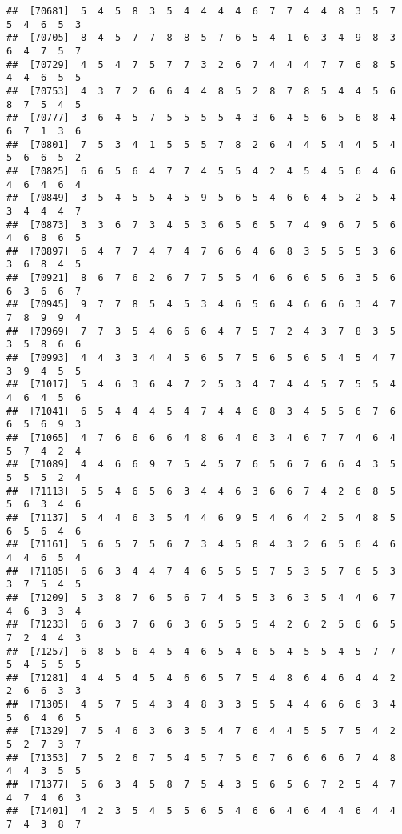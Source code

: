 \documentclass[
]{book}
\begin{document}
\begin{verbatim}
##  [70681]  5  4  5  8  3  5  4  4  4  4  6  7  7  4  4  8  3  5  7  5  4  6  5  3
##  [70705]  8  4  5  7  7  8  8  5  7  6  5  4  1  6  3  4  9  8  3  6  4  7  5  7
##  [70729]  4  5  4  7  5  7  7  3  2  6  7  4  4  4  7  7  6  8  5  4  4  6  5  5
##  [70753]  4  3  7  2  6  6  4  4  8  5  2  8  7  8  5  4  4  5  6  8  7  5  4  5
##  [70777]  3  6  4  5  7  5  5  5  5  4  3  6  4  5  6  5  6  8  4  6  7  1  3  6
##  [70801]  7  5  3  4  1  5  5  5  7  8  2  6  4  4  5  4  4  5  4  5  6  6  5  2
##  [70825]  6  6  5  6  4  7  7  4  5  5  4  2  4  5  4  5  6  4  6  4  6  4  6  4
##  [70849]  3  5  4  5  5  4  5  9  5  6  5  4  6  6  4  5  2  5  4  3  4  4  4  7
##  [70873]  3  3  6  7  3  4  5  3  6  5  6  5  7  4  9  6  7  5  6  4  6  8  6  5
##  [70897]  6  4  7  7  4  7  4  7  6  6  4  6  8  3  5  5  5  3  6  3  6  8  4  5
##  [70921]  8  6  7  6  2  6  7  7  5  5  4  6  6  6  5  6  3  5  6  6  3  6  6  7
##  [70945]  9  7  7  8  5  4  5  3  4  6  5  6  4  6  6  6  3  4  7  7  8  9  9  4
##  [70969]  7  7  3  5  4  6  6  6  4  7  5  7  2  4  3  7  8  3  5  3  5  8  6  6
##  [70993]  4  4  3  3  4  4  5  6  5  7  5  6  5  6  5  4  5  4  7  3  9  4  5  5
##  [71017]  5  4  6  3  6  4  7  2  5  3  4  7  4  4  5  7  5  5  4  4  6  4  5  6
##  [71041]  6  5  4  4  4  5  4  7  4  4  6  8  3  4  5  5  6  7  6  6  5  6  9  3
##  [71065]  4  7  6  6  6  6  4  8  6  4  6  3  4  6  7  7  4  6  4  5  7  4  2  4
##  [71089]  4  4  6  6  9  7  5  4  5  7  6  5  6  7  6  6  4  3  5  5  5  5  2  4
##  [71113]  5  5  4  6  5  6  3  4  4  6  3  6  6  7  4  2  6  8  5  5  6  3  4  6
##  [71137]  5  4  4  6  3  5  4  4  6  9  5  4  6  4  2  5  4  8  5  6  5  6  4  6
##  [71161]  5  6  5  7  5  6  7  3  4  5  8  4  3  2  6  5  6  4  6  4  4  6  5  4
##  [71185]  6  6  3  4  4  7  4  6  5  5  5  7  5  3  5  7  6  5  3  3  7  5  4  5
##  [71209]  5  3  8  7  6  5  6  7  4  5  5  3  6  3  5  4  4  6  7  4  6  3  3  4
##  [71233]  6  6  3  7  6  6  3  6  5  5  5  4  2  6  2  5  6  6  5  7  2  4  4  3
##  [71257]  6  8  5  6  4  5  4  6  5  4  6  5  4  5  5  4  5  7  7  5  4  5  5  5
##  [71281]  4  4  5  4  5  4  6  6  5  7  5  4  8  6  4  6  4  4  2  2  6  6  3  3
##  [71305]  4  5  7  5  4  3  4  8  3  3  5  5  4  4  6  6  6  3  4  5  6  4  6  5
##  [71329]  7  5  4  6  3  6  3  5  4  7  6  4  4  5  5  7  5  4  2  5  2  7  3  7
##  [71353]  7  5  2  6  7  5  4  5  7  5  6  7  6  6  6  6  7  4  8  4  4  3  5  5
##  [71377]  5  6  3  4  5  8  7  5  4  3  5  6  5  6  7  2  5  4  7  4  7  4  6  3
##  [71401]  4  2  3  5  4  5  5  6  5  4  6  6  4  6  4  4  6  4  4  7  4  3  8  7

\end{verbatim}
\end{document}
